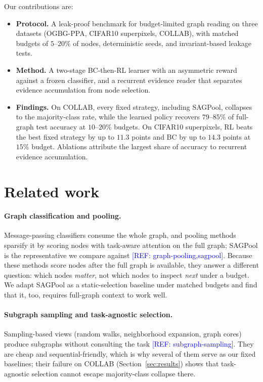 \documentclass{article}
\newcommand{\refadd}[1]{\textcolor{blue}{[REF: #1]}}
\begin{document}
Our contributions are:
\begin{itemize}
  \item \textbf{Protocol.} A leak-proof benchmark for budget-limited graph reading on three datasets (OGBG-PPA, CIFAR10 superpixels, COLLAB), with matched budgets of $5$--$20\%$ of nodes, deterministic seeds, and invariant-based leakage tests.
  \item \textbf{Method.} A two-stage BC-then-RL learner with an asymmetric reward against a frozen classifier, and a recurrent evidence reader that separates evidence accumulation from node selection.
  \item \textbf{Findings.} On COLLAB, every fixed strategy, including SAGPool, collapses to the majority-class rate, while the learned policy recovers $79$--$85\%$ of full-graph test accuracy at $10$--$20\%$ budgets. On CIFAR10 superpixels, RL beats the best fixed strategy by up to $11.3$ points and BC by up to $14.3$ points at $15\%$ budget. Ablations attribute the largest share of accuracy to recurrent evidence accumulation.
\end{itemize}

\section{Related work}
\label{sec:related}

\paragraph{Graph classification and pooling.}
Message-passing classifiers consume the whole graph, and pooling methods sparsify it by scoring nodes with task-aware attention on the full graph; SAGPool is the representative we compare against \refadd{graph-pooling,sagpool}. Because these methods score nodes after the full graph is available, they answer a different question: which nodes \emph{matter}, not which nodes to inspect \emph{next} under a budget. We adapt SAGPool as a static-selection baseline under matched budgets and find that it, too, requires full-graph context to work well.

\paragraph{Subgraph sampling and task-agnostic selection.}
Sampling-based views (random walks, neighborhood expansion, graph cores) produce subgraphs without consulting the task \refadd{subgraph-sampling}. They are cheap and sequential-friendly, which is why several of them serve as our fixed baselines; their failure on COLLAB (Section~\ref{sec:results}) shows that task-agnostic selection cannot escape majority-class collapse there.
\end{document}
